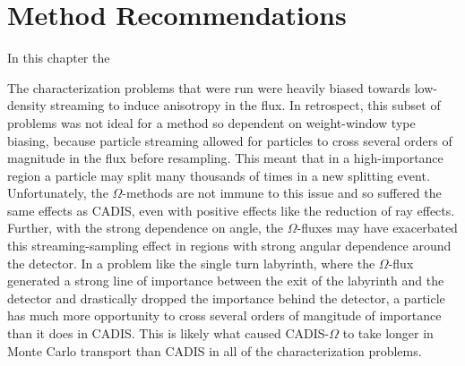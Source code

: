 \section{Method Recommendations}
\label{sec:method_recs}


In this chapter the




The characterization problems that were run were heavily biased towards
low-density streaming to induce anisotropy in the flux. In retrospect, this subset of
problems was not ideal for a method so dependent on weight-window type biasing,
because particle streaming allowed for particles to cross several orders of
magnitude in the flux before resampling. This meant that in a high-importance
region a particle may split many thousands of times in a new splitting event.
Unfortunately, the $\Omega$-methods are not immune to this issue and so suffered
the same effects as CADIS, even with positive effects like the reduction of ray
effects. Further, with the strong dependence on angle, the $\Omega$-fluxes may
have exacerbated this streaming-sampling effect in regions with strong angular
dependence around the detector. In a problem like the single turn labyrinth,
where the $\Omega$-flux generated a strong line of importance between the exit
of the labyrinth and the detector and drastically dropped the importance behind
the detector, a particle has much more opportunity to cross several orders of
mangitude of importance than it does in CADIS. This is likely what caused
CADIS-$\Omega$ to take longer in Monte Carlo transport than CADIS in all of the
characterization problems.

